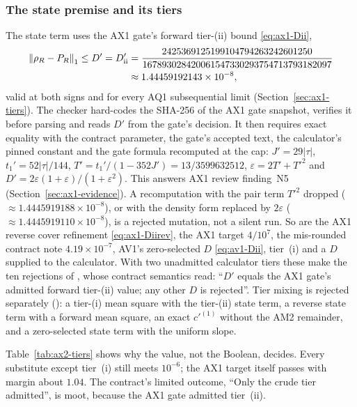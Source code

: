 \subsubsection{The state premise and its tiers}
\label{sec:ax2-state}
The state term uses the AX1 gate's forward tier-(ii) bound \eqref{eq:ax1-Dii},
\begin{equation}
 \begin{aligned}
 \left\lVert\rho_R-P_R\right\rVert_1\le D'=D'_{\rm ii}
 &=\frac{2425369125199104794263242601250}{167893028420061547330293754713793182097}\\
 &\approx1.44459192143\times10^{-8},
 \end{aligned}
 \label{eq:ax2-Dprime}
\end{equation}
valid at both signs and for every AQ1 subsequential limit
(Section~\ref{sec:ax1-tiers}). The checker hard-codes the SHA-256 of the AX1
gate snapshot, verifies it before parsing and reads $D'$ from the gate's
decision. It then requires exact equality with the contract parameter, the
gate's accepted text, the calculator's pinned constant and the gate formula
recomputed at the cap: $J'=29|\tau|$, $t_1'=52|\tau|/144$,
$T'=t_1'/(1-352J')=13/3599632512$, $\varepsilon=2T'+T'^2$ and
$D'=2\varepsilon(1+\varepsilon)/(1+\varepsilon^2)$. This answers AX1 review
finding~N5 (Section~\ref{sec:ax1-evidence}). A recomputation with the pair
term $T'^2$ dropped ($\approx1.4445919188\times10^{-8}$), or with the density
form replaced by $2\varepsilon$ ($\approx1.4445919110\times10^{-8}$), is a
rejected mutation, not a silent run. So are the AX1 reverse cover refinement
\eqref{eq:ax1-Diirev}, the AX1 target $4/10^7$, the mis-rounded contract note
$4.19\times10^{-7}$, AV1's zero-selected $D$ \eqref{eq:av1-Dii}, tier~(i) and
a $D$ supplied to the calculator. With two unadmitted calculator tiers these
make the ten rejections of , whose contract semantics
read: ``$D'$ equals the AX1 gate's admitted forward tier-(ii) value; any other
$D$ is rejected''. Tier mixing is rejected separately ():
a tier-(i) mean square with the tier-(ii) state term, a reverse state term
with a forward mean square, an exact $c'^{(1)}$ without the AM2 remainder, and
a zero-selected state term with the uniform slope.

Table~\ref{tab:ax2-tiers} shows why the value, not the Boolean, decides. Every
substitute except tier~(i) still meets $10^{-6}$; the AX1 target itself passes
with margin about $1.04$. The contract's limited outcome, ``Only the crude
tier admitted'', is moot, because the AX1 gate admitted tier~(ii).

